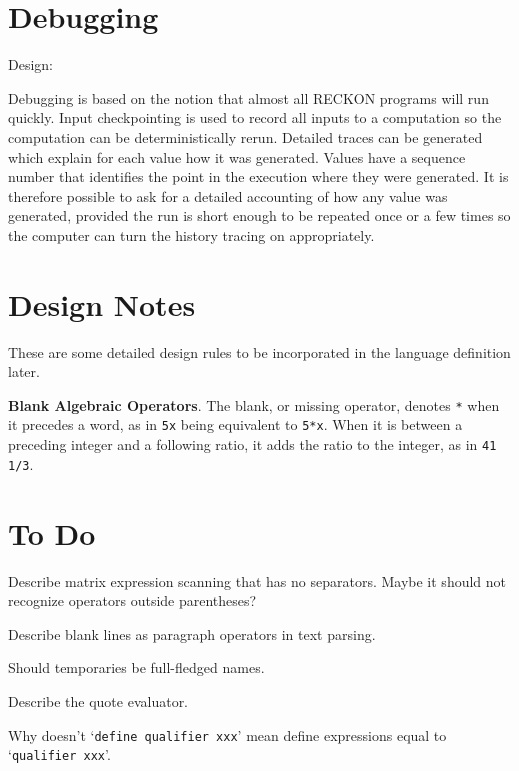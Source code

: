 \documentclass[12pt]{article}
\begin{document}
\section{Debugging}

Design:

Debugging is based on the notion that almost all
RECKON programs will run quickly.
Input checkpointing is used to record all inputs to a computation
so the computation can be deterministically rerun.  Detailed
traces can be generated which explain for each value how it was generated.
Values have a sequence number that identifies the point in the execution
where they were generated.  It is therefore possible to ask for a detailed
accounting of how any value was generated, provided the run is short enough
to be repeated once or a few times so the computer can turn the history
tracing on appropriately.

\section{Design Notes}

These are some detailed design rules to be incorporated in the language
definition later.

\begin{list}{}{}

\item
{\bf Blank Algebraic Operators}.
The blank, or missing operator, denotes \verb|*| when it precedes a word,
as in \verb|5x| being equivalent to \verb|5*x|.  When it is between a
preceding integer and a following ratio, it adds the ratio to the integer,
as in \verb|41 1/3|.

\end{list}

\section{To Do}

Describe matrix expression scanning that has no separators.
Maybe it should not recognize operators outside parentheses?

Describe blank lines as paragraph operators in text parsing.

Should temporaries be full-fledged names.

Describe the quote evaluator.\label{QUOTE-EVALUATOR}

Why doesn't `\verb|define qualifier xxx|' mean define expressions equal
to `\verb|qualifier xxx|'.
\end{document}
